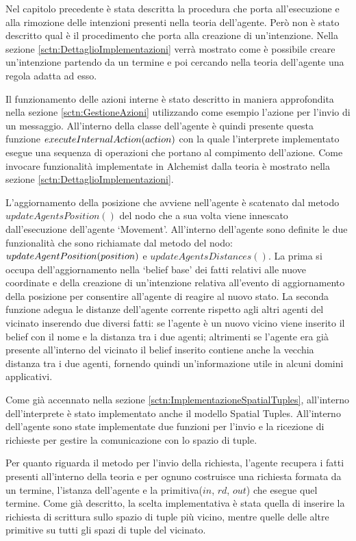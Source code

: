 Nel capitolo precedente è stata descritta la procedura che porta all'esecuzione e alla rimozione delle intenzioni presenti nella teoria dell'agente. Però non è stato descritto qual è il procedimento che porta alla creazione di un'intenzione.
Nella sezione \ref{sctn:DettaglioImplementazioni} verrà mostrato come è possibile creare un'intenzione partendo da un termine e poi cercando nella teoria dell'agente una regola adatta ad esso.

Il funzionamento delle azioni interne è stato descritto in maniera approfondita nella sezione \ref{sctn:GestioneAzioni} utilizzando come esempio l'azione per l'invio di un messaggio. All'interno della classe dell'agente è quindi presente questa funzione $ex\-e\-cuteIn\-ter\-nalAc\-tion(action)$ con la quale l'interprete implementato esegue una sequenza di operazioni che portano al compimento dell'azione. Come invocare funzionalità implementate in Alchemist dalla teoria è mostrato nella sezione \ref{sctn:DettaglioImplementazioni}.

L'aggiornamento della posizione che avviene nell'agente è scatenato dal metodo $updateAgentsPosition()$ del nodo che a sua volta viene innescato dall'esecuzione dell'agente `Movement'. All'interno dell'agente sono definite le due funzionalità che sono richiamate dal metodo del nodo: $up\-da\-teA\-ge\-ntPo\-si\-tion(po\-si\-tion)$ e $updateAgentsDistances()$. La prima si occupa dell'aggiornamento nella `belief base' dei fatti relativi alle nuove coordinate e della creazione di un'intenzione relativa all'evento di aggiornamento della posizione per consentire all'agente di reagire al nuovo stato.
La seconda funzione adegua le distanze dell'agente corrente rispetto agli altri agenti del vicinato inserendo due diversi fatti: se l'agente è un nuovo vicino viene inserito il belief con il nome e la distanza tra i due agenti; altrimenti se l'agente era già presente all'interno del vicinato il belief inserito contiene anche la vecchia distanza tra i due agenti, fornendo quindi un'informazione utile in alcuni domini applicativi.

Come già accennato nella sezione \ref{sctn:ImplementazioneSpatialTuples}, all'interno dell'interprete è stato implementato anche il modello Spatial Tuples.
All'interno dell'agente sono state implementate due funzioni per l'invio e la ricezione di richieste per gestire la comunicazione con lo spazio di tuple.

Per quanto riguarda il metodo per l'invio della richiesta, l'agente recupera i fatti presenti all'interno della teoria e per ognuno costruisce una richiesta formata da un termine, l'istanza dell'agente e la primitiva($in$, $rd$, $out$) che esegue quel termine. Come già descritto, la scelta implementativa è stata quella di inserire la richiesta di scrittura sullo spazio di tuple più vicino, mentre quelle delle altre primitive su tutti gli spazi di tuple del vicinato.

